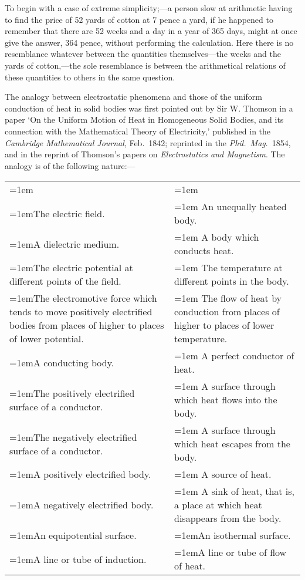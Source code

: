 \documentclass[12pt,oneside]{book}[2021/10/04]
\newcommand{\¬}{\hphantom{0}}
\begin{document}
To begin with a case of extreme simplicity;---a person slow at
arithmetic having to find the price of 52 yards of cotton at 7 pence
a yard, if he happened to remember that there are 52 weeks and a
day in a year of 365 days, might at once give the answer, 364
pence, without performing the calculation. Here there is no resemblance
whatever between the quantities themselves---the weeks
and the yards of cotton,---the sole resemblance is between the arithmetical
relations of these quantities to others in the same question.

The analogy between electrostatic phenomena and those of the
uniform conduction of heat in solid bodies was first pointed out by
Sir W. Thomson in a paper `On the Uniform Motion of Heat in
Homogeneous Solid Bodies, and its connection with the Mathematical
Theory of Electricity,' published in the \textit{Cambridge Mathematical
Journal}, Feb.\ 1842; reprinted in the \textit{Phil.\ Mag}.\ 1854, and in the
reprint of Thomson's papers on \textit{Electrostatics and Magnetism}. The
analogy is of the following nature:---

\begin{table}[H]
\centering
\footnotesize
\begin{tabular}{>{\hangindent=1em}p{}|>{\hangindent=1em}p{}}
\multicolumn{1}{c|}{\textit{Electrostatics.}} &
\multicolumn{1}{c}{\textit{Heat.}}\\
The electric field. & An unequally heated body.\\
A dielectric medium. & A body which conducts heat.\\
The electric potential at different points of the field. &
The temperature at different points in the body.\\
The electromotive force which tends to
move positively electrified bodies from
places of higher to places of lower potential. &
The flow of heat by conduction from
places of higher to places of lower temperature.\\
A conducting body. & A perfect conductor of heat.\\
The positively electrified surface of a conductor. &
A surface through which heat flows into the body.\\
The negatively electrified surface of a conductor.&
A surface through which heat escapes from the body.\\
A positively electrified body. & A source of heat.\\
A negatively electrified body.&
A sink of heat, that is, a place at which
heat disappears from the body.\\
An equipotential surface.&An isothermal surface.\\
A line or tube of induction.&A line or tube of flow of heat.
\end{tabular}
\end{table}
\end{document}
